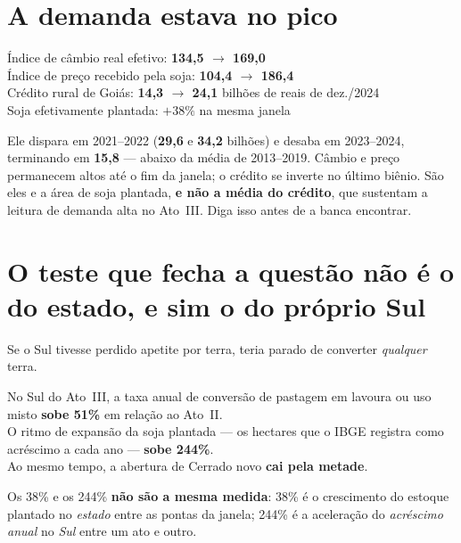 \section{A demanda estava no pico}

\begin{ancora}
Índice de câmbio real efetivo: \textbf{134,5 $\to$ 169,0} \\
Índice de preço recebido pela soja: \textbf{104,4 $\to$ 186,4} \\
Crédito rural de Goiás: \textbf{14,3 $\to$ 24,1} bilhões de reais de dez./2024 \\
Soja efetivamente plantada: \textbf{$+38\%$} na mesma janela
\end{ancora}

\begin{armadilha}
Ele dispara em 2021--2022 (\textbf{29,6} e \textbf{34,2} bilhões) e desaba em
2023--2024, terminando em \textbf{15,8} --- abaixo da média de 2013--2019.
Câmbio e preço permanecem altos até o fim da janela; o crédito se inverte no
último biênio. São eles e a área de soja plantada, \textbf{e não a média do
crédito}, que sustentam a leitura de demanda alta no Ato~III. Diga isso antes de
a banca encontrar.
\end{armadilha}

\section{O teste que fecha a questão não é o do estado, e sim o do próprio Sul}

Se o Sul tivesse perdido apetite por terra, teria parado de converter
\emph{qualquer} terra.

\begin{ancora}
No Sul do Ato~III, a taxa anual de conversão de pastagem em lavoura ou uso misto
\textbf{sobe 51\%} em relação ao Ato~II. \\
O ritmo de expansão da soja plantada --- os hectares que o IBGE registra como
acréscimo a cada ano --- \textbf{sobe 244\%}. \\
Ao mesmo tempo, a abertura de Cerrado novo \textbf{cai pela metade}.
\end{ancora}

\begin{armadilha}
Os 38\% e os 244\% \textbf{não são a mesma medida}: 38\% é o crescimento do
estoque plantado no \emph{estado} entre as pontas da janela; 244\% é a
aceleração do \emph{acréscimo anual} no \emph{Sul} entre um ato e outro.
\end{armadilha}

